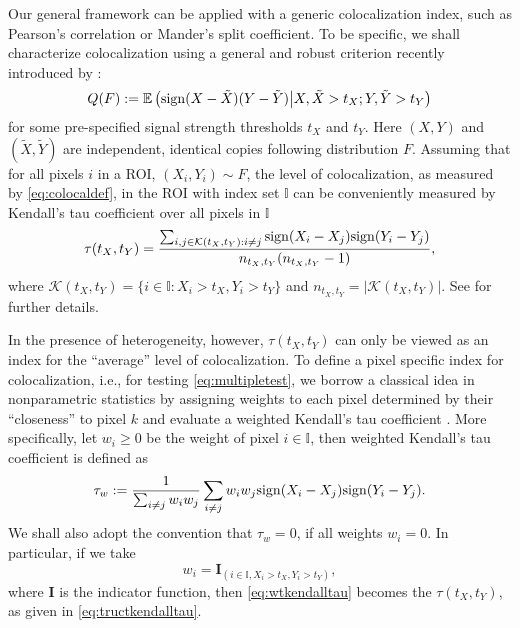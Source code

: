 \documentclass[10pt,twocolumn,twoside]{IEEEtran}
\def\II{{\mathbb I}}
\def\sign{{\rm sign}}
\def\Kcal{\mathcal K}
\def\EE{\mathbb{E}}
\begin{document}
Our general framework can be applied with a generic colocalization index, such as Pearson's correlation or Mander's split coefficient. To be specific, we shall characterize colocalization using a general and robust criterion recently introduced by \cite{wang2017}:
\begin{equation}
\label{eq:colocaldef}
Q(F):=\EE\left(\sign(X-\tilde{X})(Y-\tilde{Y})\middle|X,\tilde{X}>t_X;Y,\tilde{Y}>t_Y\right)
\end{equation}
for some pre-specified signal strength thresholds $t_X$ and $t_Y$. Here $(X,Y)$ and $(\tilde{X},\tilde{Y})$ are independent, identical copies following distribution $F$. Assuming that for all pixels $i$ in a ROI, $(X_i,Y_i)\sim F$, the level of colocalization, as measured by \eqref{eq:colocaldef}, in the ROI with index set $\II$ can be conveniently measured by Kendall's tau coefficient over all pixels in $\II$
\begin{equation}
\label{eq:tructkendalltau}
\tau(t_X,t_Y)={\sum_{i,j\in\Kcal(t_X,t_Y):i\ne j}\sign(X_i-X_j)\sign(Y_i-Y_j)\over n_{t_X,t_Y}(n_{t_X,t_Y}-1)},
\end{equation}
where $\Kcal(t_X,t_Y)=\{i\in\II:X_i>t_X,Y_i>t_Y\}$ and $n_{t_X,t_Y}=|\Kcal(t_X,t_Y)|$. See \cite{wang2017} for further details.


In the presence of heterogeneity, however, $\tau(t_X,t_Y)$ can only be viewed as an index for the ``average'' level of colocalization. To define a pixel specific index for colocalization, i.e., for testing \eqref{eq:multipletest}, we borrow a classical idea in nonparametric statistics by assigning weights to each pixel determined by their ``closeness'' to pixel $k$ and evaluate a weighted Kendall's tau coefficient \citep{Shieh1998}. More specifically, let $w_i\ge 0$ be the weight of pixel $i\in\II$, then weighted Kendall's tau coefficient is defined as
\begin{equation}
\label{eq:wtkendalltau}
\tau_w:={1 \over \sum_{i\ne j}w_iw_j}\sum_{i\ne j}w_iw_j\sign(X_i-X_j)\sign(Y_i-Y_j).
\end{equation}
We shall also adopt the convention that $\tau_w=0$, if all weights $w_i=0$. In particular, if we take
$$
w_i=\mathbf{I}_{(i\in\II, X_i>t_X,Y_i>t_Y)},
$$
where $\mathbf{I}$ is the indicator function, then \eqref{eq:wtkendalltau} becomes the $\tau(t_X,t_Y)$, as given in \eqref{eq:tructkendalltau}.
\end{document}
